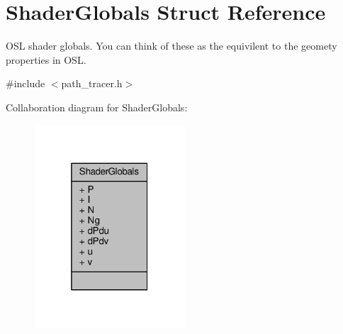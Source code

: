 \hypertarget{struct_shader_globals}{\section{Shader\-Globals Struct Reference}
\label{struct_shader_globals}
}


O\-S\-L shader globals. You can think of these as the equivilent to the geomety properties in O\-S\-L.  




{\ttfamily \#include $<$path\-\_\-tracer.\-h$>$}



Collaboration diagram for Shader\-Globals\-:
\nopagebreak
\begin{figure}[H]
\begin{center}
\leavevmode
\includegraphics[width=160pt]{struct_shader_globals__coll__graph}
\end{center}
\end{figure}
